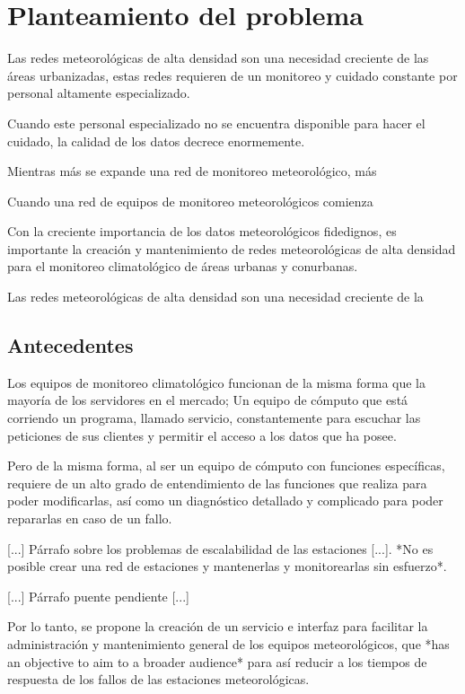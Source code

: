 \section{Planteamiento del problema}

Las redes meteorológicas de alta densidad son una necesidad creciente de las áreas urbanizadas, estas redes requieren de un monitoreo y cuidado constante por personal altamente especializado.

Cuando este personal especializado no se encuentra disponible para hacer el cuidado, la calidad de los datos decrece enormemente.


Mientras más se expande una red de monitoreo meteorológico, más

Cuando una red de equipos de monitoreo meteorológicos comienza

Con la creciente importancia de los datos meteorológicos fidedignos, es importante la creación y mantenimiento de redes meteorológicas de alta densidad para el monitoreo climatológico de áreas urbanas y conurbanas.




Las redes meteorológicas de alta densidad son una necesidad creciente de la


\subsection{Antecedentes}\label{sec:Ant}

Los equipos de monitoreo climatológico funcionan de la misma forma que la mayoría de los servidores en el mercado; Un equipo de cómputo que está corriendo un programa, llamado servicio, constantemente para escuchar las peticiones de sus clientes y permitir el acceso a los datos que ha posee.

Pero de la misma forma, al ser un equipo de cómputo con funciones específicas, requiere de un alto grado de entendimiento de las funciones que realiza para poder modificarlas, así como un diagnóstico detallado y complicado para poder repararlas en caso de un fallo.

[...] Párrafo sobre los problemas de escalabilidad de las estaciones [...]. *No es posible crear una red de estaciones y mantenerlas y monitorearlas sin esfuerzo*.

[...] Párrafo puente pendiente [...]

Por lo tanto, se propone la creación de un servicio e interfaz para facilitar la administración y mantenimiento general de los equipos meteorológicos, que *has an objective to aim to a broader audience* para así reducir a los tiempos de respuesta de los fallos de las estaciones meteorológicas.

